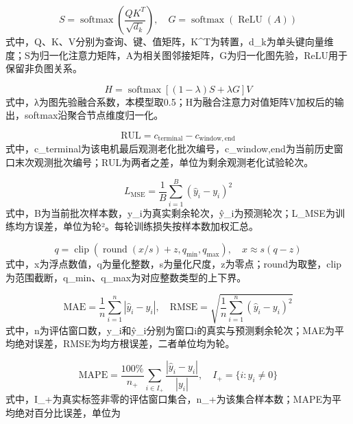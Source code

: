 \documentclass[UTF8]{ctexart}
\begin{document}
\begin{equation}
S=\operatorname{softmax}\left(\frac{QK^T}{\sqrt{d_k}}\right),\quad G=\operatorname{softmax}(\operatorname{ReLU}(A))
\tag{15}
\end{equation}
式中，Q、K、V分别为查询、键、值矩阵，K^T为转置，d\_k为单头键向量维度；S为归一化注意力矩阵，A为相关图邻接矩阵，G为归一化图先验，ReLU用于保留非负图关系。

\begin{equation}
H=\operatorname{softmax}[(1-\lambda)S+\lambda G]V
\tag{16}
\end{equation}
式中，λ为图先验融合系数，本模型取0.5；H为融合注意力对值矩阵V加权后的输出，softmax沿聚合节点维度归一化。

\begin{equation}
\mathrm{RUL}=c_{\mathrm{terminal}}-c_{\mathrm{window,end}}
\tag{17}
\end{equation}
式中，c\_terminal为该电机最后观测老化批次编号，c\_window,end为当前历史窗口末次观测批次编号；RUL为两者之差，单位为剩余观测老化试验轮次。

\begin{equation}
L_{\mathrm{MSE}}=\frac{1}{B}\sum_{i=1}^{B}(\hat y_i-y_i)^2
\tag{18}
\end{equation}
式中，B为当前批次样本数，y\_i为真实剩余轮次，ŷ\_i为预测轮次；L\_MSE为训练均方误差，单位为轮²。每轮训练损失按样本数加权汇总。

\begin{equation}
q=\operatorname{clip}\left(\operatorname{round}(x/s)+z,q_{\min},q_{\max}\right),\quad x\approx s(q-z)
\tag{19}
\end{equation}
式中，x为浮点数值，q为量化整数，s为量化尺度，z为零点；round为取整，clip为范围截断，q\_min、q\_max为对应整数类型的上下界。

\begin{equation}
\mathrm{MAE}=\frac{1}{n}\sum_{i=1}^{n}|\hat y_i-y_i|,\quad\mathrm{RMSE}=\sqrt{\frac{1}{n}\sum_{i=1}^{n}(\hat y_i-y_i)^2}
\tag{20}
\end{equation}
式中，n为评估窗口数，y\_i和ŷ\_i分别为窗口i的真实与预测剩余轮次；MAE为平均绝对误差，RMSE为均方根误差，二者单位均为轮。

\begin{equation}
\mathrm{MAPE}=\frac{100\%}{n_+}\sum_{i\in I_+}\frac{|\hat y_i-y_i|}{|y_i|},\quad I_+=\{i:y_i\ne0\}
\tag{21}
\end{equation}
式中，I\_+为真实标签非零的评估窗口集合，n\_+为该集合样本数；MAPE为平均绝对百分比误差，单位为%
\end{document}
